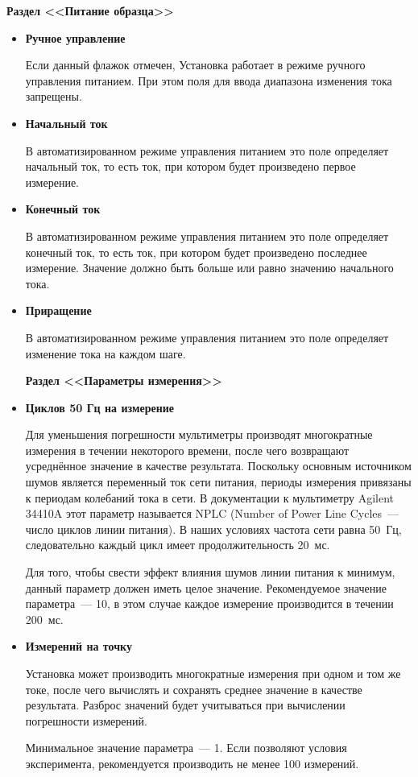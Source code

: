 \documentclass[12pt, a4paper, twocolumn]{book}
\newcommand{\PARAM}[1]{\item {\bf #1} }
\newcommand{\PARAMSECTION}[1]{\vbox{}{\bf Раздел <<#1>>}}
\begin{document}
\PARAMSECTION{Питание образца}

\begin{itemize}

\PARAM{Ручное управление}

Если данный флажок отмечен, Установка работает в режиме ручного управления питанием. При этом поля для ввода диапазона изменения тока запрещены.

\PARAM{Начальный ток}

В автоматизированном режиме управления питанием это поле определяет начальный ток, то есть ток, при котором будет произведено первое измерение.

\PARAM{Конечный ток}

В автоматизированном режиме управления питанием это поле определяет конечный ток, то есть ток, при котором будет произведено последнее измерение. Значение должно быть больше или равно значению начального тока.

\PARAM{Приращение}

В автоматизированном режиме управления питанием это поле определяет изменение тока на каждом шаге.

\PARAMSECTION{Параметры измерения}

\PARAM{Циклов 50 Гц на измерение}

Для уменьшения погрешности мультиметры производят многократные измерения в течении некоторого времени, после чего возвращают усреднённое значение в качестве результата. Поскольку основным источником шумов является переменный ток сети питания, периоды измерения привязаны к периодам колебаний тока в сети. В документации к мультиметру Agilent 34410A этот параметр называется NPLC (Number of Power Line Cycles~--- число циклов линии питания). В наших условиях частота сети равна 50~Гц, следовательно каждый цикл имеет продолжительность 20~мс.

Для того, чтобы свести эффект влияния шумов  линии питания к минимум, данный параметр должен иметь целое значение. Рекомендуемое значение параметра~--- 10, в этом случае каждое измерение производится в течении 200~мс.

\PARAM{Измерений на точку}

Установка может производить многократные измерения при одном и том же токе, после чего вычислять и сохранять среднее значение в качестве результата. Разброс значений будет учитываться при вычислении погрешности измерений.

Минимальное значение параметра~--- 1. Если позволяют условия эксперимента, рекомендуется производить не менее 100 измерений.


\end{itemize}
\end{document}
